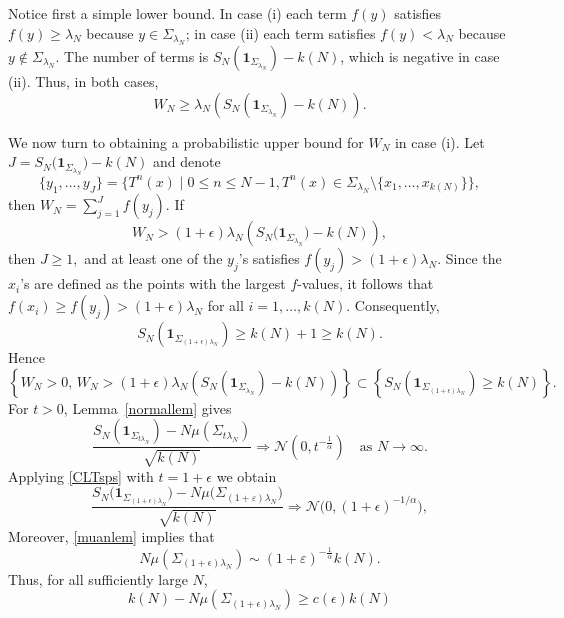 \documentclass[11pt,twoside,a4paper,reqno]{amsart}
\newcommand{\as}[1]{\text{as } #1 \rightarrow\infty}
\def\one{{\mathbf{1}}}
\begin{document}
Notice first a simple lower bound. In case (i) each term $f(y)$ satisfies $f(y)\geq \lambda_N$ because $y\in\Sigma_{\lambda_N}$; in case (ii) each term satisfies $f(y)<\lambda_N$ because $y\notin\Sigma_{\lambda_N}$.
The number of terms is $S_N(\one_{\Sigma_{\lambda_N}})-k(N)$, which is negative in case (ii).
Thus, in both cases,
\begin{equation}\label{Wntrivbound}
W_N\geq \lambda_N\left(S_N(\one_{\Sigma_{\lambda_N}})-k(N)\right).
\end{equation}


We now turn to obtaining a probabilistic upper bound for $W_N$ in case (i). Let $J=S_N\bigl(\one_{\Sigma_{\lambda_N}}\bigr)-k(N)$ and denote
\begin{equation*}
\{y_1,\dots , y_J\}= \{T^n(x) \;|\;0\leq n\leq N-1, T^n(x) \in \Sigma_{\lambda_N} \setminus \{x_1,\dots,x_{k(N)}\}\},
\end{equation*}
then $W_N=\sum_{j=1}^J f(y_j)$. If
$$
W_N>(1+\epsilon)\lambda_N\left(S_N\bigl(\one_{\Sigma_{\lambda_N}}\bigr)-k(N)\right),
$$
then $J\geq1,$ and at least one of the $y_j$'s satisfies $f(y_j)>(1+\epsilon)\lambda_N$. Since the $x_i$'s are defined as the points with the largest $f$-values, it follows that $f(x_i)\geq f(y_j)>(1+\epsilon)\lambda_N$ for all $i=1,\dots, k(N)$. Consequently,
$$S_N\left(\one_{\Sigma_{(1+\epsilon)\lambda_N}}\right)\ge k(N)+1\geq k(N).$$
Hence
\begin{equation}\label{WNpi}
\left\{W_N > 0,\, W_N > (1 + \epsilon) \lambda_N \left(S_N(\one_{\Sigma_{\lambda_N}})-k(N)\right)\right\}
\subset\left\{S_N\left(\one_{\Sigma_{(1+\epsilon)\lambda_N}}\right)\ge k(N)\right\}.
\end{equation}
For $t>0$, Lemma~\ref{normallem} gives
\begin{equation}\label{CLTsps}
\frac{S_N(\one_{\Sigma_{t \lambda_N}}) - N \mu(\Sigma_{t \lambda_N})}{\sqrt{k(N)}} \Rightarrow \mathcal{N}(0,t^{-\frac{1}{\alpha}}) \quad \as{N}.
\end{equation}
Applying \eqref{CLTsps} with $t=1+\epsilon$ we obtain
\begin{equation}\label{CLT1p}
\frac{S_N\bigl(\one_{\Sigma_{(1+\epsilon)\lambda_N}}\bigr)
-N\mu\bigl(\Sigma_{(1+\varepsilon)\lambda_N}\bigr)}{\sqrt{k(N)}}
\Rightarrow\mathcal{N}\bigl(0,(1+\epsilon)^{-1/\alpha}\bigr),
\end{equation}
Moreover, \eqref{muanlem} implies that
$$
N\mu\left(\Sigma_{(1+\epsilon)\lambda_N}\right)
\sim
(1+\varepsilon)^{-\frac{1}{\alpha}}k(N).
$$
Thus, for all sufficiently large $N$,
\begin{equation}\label{kN1p}
k(N)-N\mu(\Sigma_{(1+\epsilon)\lambda_N})
\ge c(\epsilon)k(N)
\end{equation}
\end{document}
